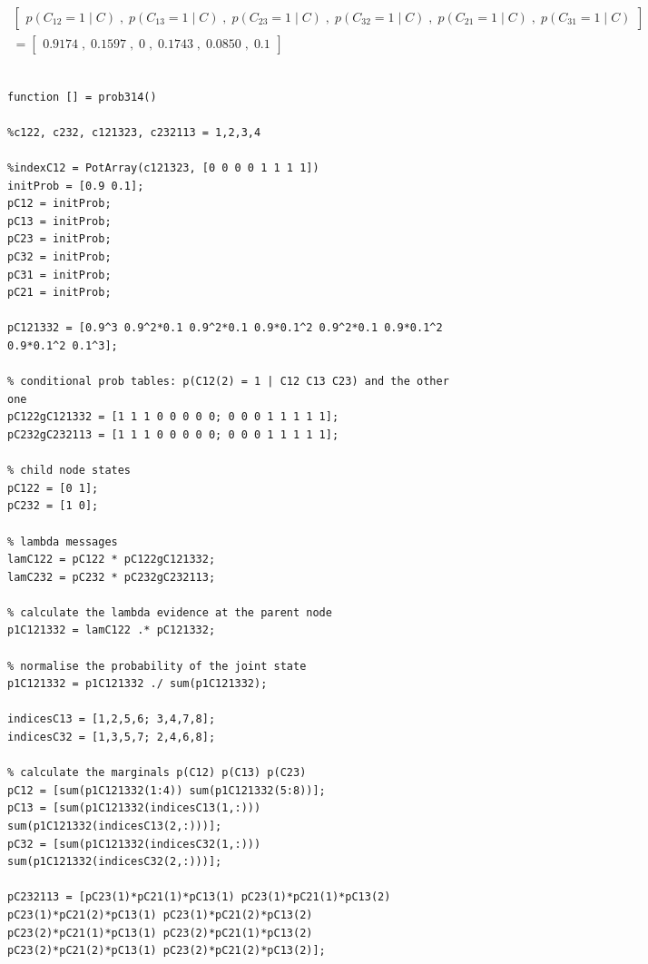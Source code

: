 \documentclass[11pt,a4paper,oneside]{report}
\begin{document}
\begin{equation}
\begin{split}
\begin{bmatrix}
p(C_{12} = 1 \; | \; C) \; , \; p(C_{13} = 1 \; | \; C)  \; , \; p(C_{23} = 1 \; | \; C) \; , \; p(C_{32} = 1 \; | \; C) \; , \;
p(C_{21} = 1 \; | \; C) \; , \; p(C_{31} = 1 \; | \; C) 
\end{bmatrix} \\ = 
\begin{bmatrix}
0.9174 \; , \; 0.1597 \; , \; 0 \; , \; 0.1743 \; , \; 0.0850 \; , \; 0.1
\end{bmatrix}
\end{split}
\end{equation}

\begin{lstlisting}

function [] = prob314()

%c122, c232, c121323, c232113 = 1,2,3,4

%indexC12 = PotArray(c121323, [0 0 0 0 1 1 1 1])
initProb = [0.9 0.1];
pC12 = initProb;
pC13 = initProb;
pC23 = initProb;
pC32 = initProb;
pC31 = initProb;
pC21 = initProb;

pC121332 = [0.9^3 0.9^2*0.1 0.9^2*0.1 0.9*0.1^2 0.9^2*0.1 0.9*0.1^2 0.9*0.1^2 0.1^3];

% conditional prob tables: p(C12(2) = 1 | C12 C13 C23) and the other one
pC122gC121332 = [1 1 1 0 0 0 0 0; 0 0 0 1 1 1 1 1];
pC232gC232113 = [1 1 1 0 0 0 0 0; 0 0 0 1 1 1 1 1];

% child node states
pC122 = [0 1];
pC232 = [1 0];

% lambda messages
lamC122 = pC122 * pC122gC121332;
lamC232 = pC232 * pC232gC232113;

% calculate the lambda evidence at the parent node
p1C121332 = lamC122 .* pC121332;

% normalise the probability of the joint state
p1C121332 = p1C121332 ./ sum(p1C121332);

indicesC13 = [1,2,5,6; 3,4,7,8];
indicesC32 = [1,3,5,7; 2,4,6,8];

% calculate the marginals p(C12) p(C13) p(C23)
pC12 = [sum(p1C121332(1:4)) sum(p1C121332(5:8))];
pC13 = [sum(p1C121332(indicesC13(1,:))) sum(p1C121332(indicesC13(2,:)))];
pC32 = [sum(p1C121332(indicesC32(1,:))) sum(p1C121332(indicesC32(2,:)))];

pC232113 = [pC23(1)*pC21(1)*pC13(1) pC23(1)*pC21(1)*pC13(2) pC23(1)*pC21(2)*pC13(1) pC23(1)*pC21(2)*pC13(2) pC23(2)*pC21(1)*pC13(1) pC23(2)*pC21(1)*pC13(2) pC23(2)*pC21(2)*pC13(1) pC23(2)*pC21(2)*pC13(2)];


\end{lstlisting}
\end{document}

